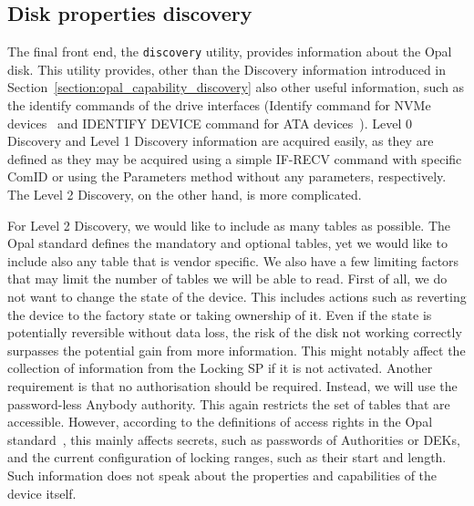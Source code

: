 \subsection{Disk properties discovery}
\label{utility_discovery}

The final front end, the \verb|discovery| utility, provides information about the Opal disk.
This utility provides, other than the Discovery information introduced in Section~\ref{section:opal_capability_discovery} also other useful information, such as the identify commands of the drive interfaces (Identify command for NVMe devices~\cite{nvme-express-base-specification} and IDENTIFY DEVICE command for ATA devices~\cite{acs-3}).
Level 0 Discovery and Level 1 Discovery information are acquired easily, as they are defined as they may be acquired using a simple IF-RECV command with specific ComID %
or using the Parameters method without any parameters, respectively.
The Level 2 Discovery, on the other hand, is more complicated.

For Level 2 Discovery, we would like to include as many tables as possible. The Opal standard defines the mandatory and optional tables, yet we would like to include also any table that is vendor specific.
We also have a few limiting factors that may limit the number of tables we will be able to read.
First of all, we do not want to change the state of the device. This includes actions such as reverting the device to the factory state or taking ownership of it. Even if the state is potentially reversible without data loss, the risk of the disk not working correctly surpasses the potential gain from more information. This might notably affect the collection of information from the Locking SP if it is not activated.
Another requirement is that no authorisation should be required. Instead, we will use the password-less Anybody authority. This again restricts the set of tables that are accessible. However, according to the definitions of access rights in the Opal standard~\cite{tcg-opal2}, this mainly affects secrets, such as passwords of Authorities or DEKs, and the current configuration of locking ranges, such as their start and length. Such information does not speak about the properties and capabilities of the device itself.

